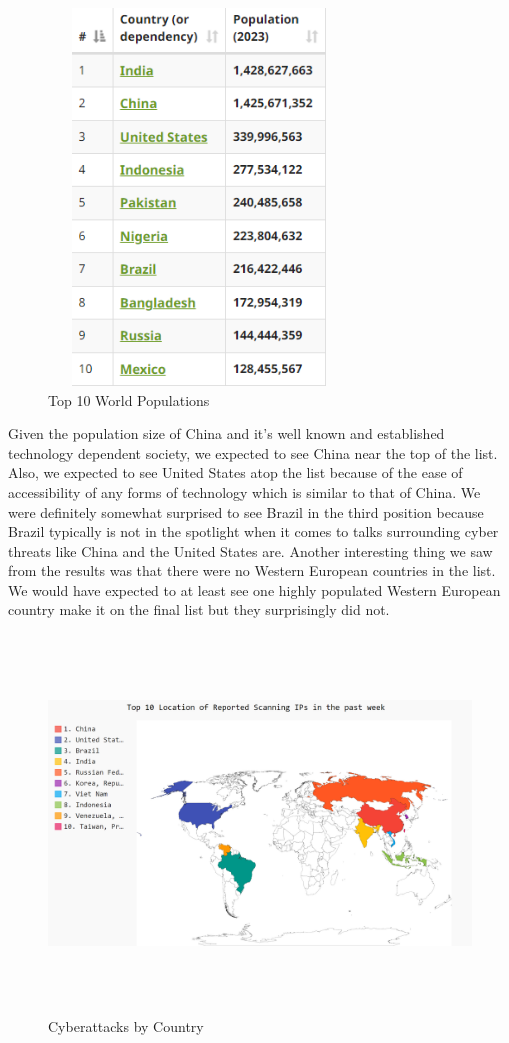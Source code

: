 \documentclass[letterpaper, 10 pt, conference]{ieeeconf}  %
\begin{document}
\begin{figure}[h]
\includegraphics[width=8cm,height=10cm]{figures/top10population.png}
\caption{Top 10 World Populations}
\end{figure}
Given the population size of China and it's well known and established technology dependent society, we expected to see China near the top of the list. Also, we expected to see United States atop the list because of the ease of accessibility of any forms of technology which is similar to that of China. We were definitely somewhat surprised to see Brazil in the third position because Brazil typically is not in the spotlight when it comes to talks surrounding cyber threats like China and the United States are. Another interesting thing we saw from the results was that there were no Western European countries in the list. We would have expected to at least see one highly populated Western European country make it on the final list but they surprisingly did not.
\begin{figure}[h]
\includegraphics[width=\textwidth,height=10cm]{figures/top10pic.png}
\caption{Cyberattacks by Country}
\end{figure}
\end{document}
